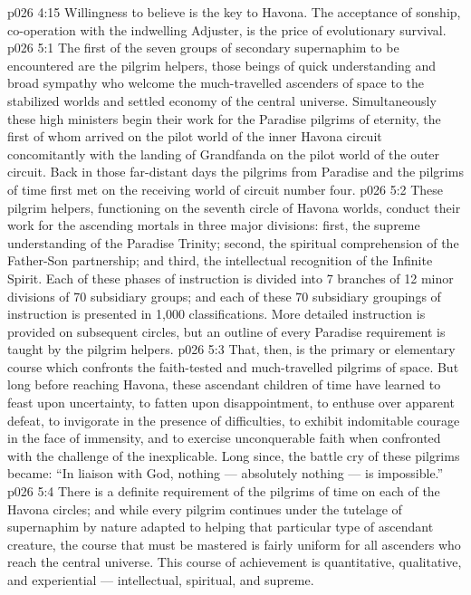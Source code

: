 \vs p026 4:15  Willingness to believe is the key to Havona. The acceptance of sonship, co\hyp{}operation with the indwelling Adjuster, is the price of evolutionary survival.
\vs p026 5:1 The first of the seven groups of secondary supernaphim to be encountered are the pilgrim helpers, those beings of quick understanding and broad sympathy who welcome the much\hyp{}travelled ascenders of space to the stabilized worlds and settled economy of the central universe. Simultaneously these high ministers begin their work for the Paradise pilgrims of eternity, the first of whom arrived on the pilot world of the inner Havona circuit concomitantly with the landing of Grandfanda on the pilot world of the outer circuit. Back in those far\hyp{}distant days the pilgrims from Paradise and the pilgrims of time first met on the receiving world of circuit number four.
\vs p026 5:2 These pilgrim helpers, functioning on the seventh circle of Havona worlds, conduct their work for the ascending mortals in three major divisions: first, the supreme understanding of the Paradise Trinity; second, the spiritual comprehension of the Father\hyp{}Son partnership; and third, the intellectual recognition of the Infinite Spirit. Each of these phases of instruction is divided into 7 branches of 12 minor divisions of 70 subsidiary groups; and each of these 70 subsidiary groupings of instruction is presented in 1,000 classifications. More detailed instruction is provided on subsequent circles, but an outline of every Paradise requirement is taught by the pilgrim helpers.
\vs p026 5:3 That, then, is the primary or elementary course which confronts the faith\hyp{}tested and much\hyp{}travelled pilgrims of space. But long before reaching Havona, these ascendant children of time have learned to feast upon uncertainty, to fatten upon disappointment, to enthuse over apparent defeat, to invigorate in the presence of difficulties, to exhibit indomitable courage in the face of immensity, and to exercise unconquerable faith when confronted with the challenge of the inexplicable. Long since, the battle cry of these pilgrims became: “In liaison with God, nothing --- absolutely nothing --- is impossible.”
\vs p026 5:4 There is a definite requirement of the pilgrims of time on each of the Havona circles; and while every pilgrim continues under the tutelage of supernaphim by nature adapted to helping that particular type of ascendant creature, the course that must be mastered is fairly uniform for all ascenders who reach the central universe. This course of achievement is quantitative, qualitative, and experiential --- intellectual, spiritual, and supreme.

